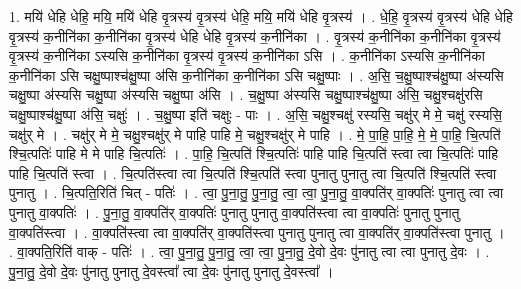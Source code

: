 \documentclass[17pt]{extarticle}
\begin{document}
1. मयि॑ धेहि धेहि॒ मयि॒ मयि॑ धेहि वृ॒त्रस्य॑ वृ॒त्रस्य॑ धेहि॒ मयि॒ मयि॑ धेहि वृ॒त्रस्य॑ । . धे॒हि॒ वृ॒त्रस्य॑ वृ॒त्रस्य॑ धेहि धेहि वृ॒त्रस्य॑ क॒नीनि॑का क॒नीनि॑का वृ॒त्रस्य॑ धेहि धेहि वृ॒त्रस्य॑ क॒नीनि॑का । . वृ॒त्रस्य॑ क॒नीनि॑का क॒नीनि॑का वृ॒त्रस्य॑ वृ॒त्रस्य॑ क॒नीनि॑का ऽस्यसि क॒नीनि॑का वृ॒त्रस्य॑ वृ॒त्रस्य॑ क॒नीनि॑का ऽसि । . क॒नीनि॑का ऽस्यसि क॒नीनि॑का क॒नीनि॑का ऽसि चक्षु॒ष्पाश्च॑क्षु॒ष्पा अ॑सि क॒नीनि॑का क॒नीनि॑का ऽसि चक्षु॒ष्पाः । . अ॒सि॒ च॒क्षु॒ष्पाश्च॑क्षु॒ष्पा अ॑स्यसि चक्षु॒ष्पा अ॑स्यसि चक्षु॒ष्पा अ॑स्यसि चक्षु॒ष्पा अ॑सि । . च॒क्षु॒ष्पा अ॑स्यसि चक्षु॒ष्पाश्च॑क्षु॒ष्पा अ॑सि॒ चक्षु॒श्चक्षु॑रसि चक्षु॒ष्पाश्च॑क्षु॒ष्पा अ॑सि॒ चक्षुः॑ । . च॒क्षु॒ष्पा इति॑ चक्षुः - पाः । . अ॒सि॒ चक्षु॒श्चक्षु॑ रस्यसि॒ चक्षु॑र् मे मे॒ चक्षु॑ रस्यसि॒ चक्षु॑र् मे । . चक्षु॑र् मे मे॒ चक्षु॒श्चक्षु॑र् मे पाहि पाहि मे॒ चक्षु॒श्चक्षु॑र् मे पाहि । . मे॒ पा॒हि॒ पा॒हि॒ मे॒ मे॒ पा॒हि॒ चि॒त्पति॑ श्चि॒त्पतिः॑ पाहि मे मे पाहि चि॒त्पतिः॑ । . पा॒हि॒ चि॒त्पति॑ श्चि॒त्पतिः॑ पाहि पाहि चि॒त्पति॑ स्त्वा त्वा चि॒त्पतिः॑ पाहि पाहि चि॒त्पति॑ स्त्वा । . चि॒त्पति॑स्त्वा त्वा चि॒त्पति॑ श्चि॒त्पति॑ स्त्वा पुनातु पुनातु त्वा चि॒त्पति॑ श्चि॒त्पति॑ स्त्वा पुनातु । . चि॒त्पति॒रिति॑ चित् - पतिः॑ । . त्वा॒ पु॒ना॒तु॒ पु॒ना॒तु॒ त्वा॒ त्वा॒ पु॒ना॒तु॒ वा॒क्पति॑र् वा॒क्पतिः॑ पुनातु त्वा त्वा पुनातु वा॒क्पतिः॑ । . पु॒ना॒तु॒ वा॒क्पति॑र् वा॒क्पतिः॑ पुनातु पुनातु वा॒क्पति॑स्त्वा त्वा वा॒क्पतिः॑ पुनातु पुनातु वा॒क्पति॑स्त्वा । . वा॒क्पति॑स्त्वा त्वा वा॒क्पति॑र् वा॒क्पति॑स्त्वा पुनातु पुनातु त्वा वा॒क्पति॑र् वा॒क्पति॑स्त्वा पुनातु । . वा॒क्पति॒रिति॑ वाक् - पतिः॑ । . त्वा॒ पु॒ना॒तु॒ पु॒ना॒तु॒ त्वा॒ त्वा॒ पु॒ना॒तु॒ दे॒वो दे॒वः पु॑नातु त्वा त्वा पुनातु दे॒वः । . पु॒ना॒तु॒ दे॒वो दे॒वः पु॑नातु पुनातु दे॒वस्त्वा᳚ त्वा दे॒वः पु॑नातु पुनातु दे॒वस्त्वा᳚ । \newline
\end{document}
